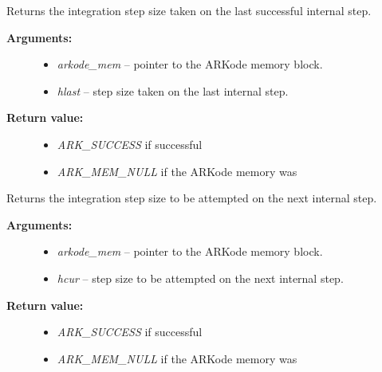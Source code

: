 \documentclass[letterpaper,10pt,english]{sphinxmanual}
\begin{document}
\begin{fulllineitems}
\label{c_interface/User_callable:ARKodeGetLastStep}
Returns the integration step size taken on the last successful
internal step.
\begin{description}
\item[{\textbf{Arguments:}}] \leavevmode\begin{itemize}
\item {} 
\emph{arkode\_mem} -- pointer to the ARKode memory block.

\item {} 
\emph{hlast} -- step size taken on the last internal step.

\end{itemize}

\item[{\textbf{Return value:}}] \leavevmode\begin{itemize}
\item {} 
\emph{ARK\_SUCCESS} if successful

\item {} 
\emph{ARK\_MEM\_NULL} if the ARKode memory was 

\end{itemize}

\end{description}

\end{fulllineitems}


\begin{fulllineitems}
\label{c_interface/User_callable:ARKodeGetCurrentStep}
Returns the integration step size to be attempted on the next internal step.
\begin{description}
\item[{\textbf{Arguments:}}] \leavevmode\begin{itemize}
\item {} 
\emph{arkode\_mem} -- pointer to the ARKode memory block.

\item {} 
\emph{hcur} -- step size to be attempted on the next internal step.

\end{itemize}

\item[{\textbf{Return value:}}] \leavevmode\begin{itemize}
\item {} 
\emph{ARK\_SUCCESS} if successful

\item {} 
\emph{ARK\_MEM\_NULL} if the ARKode memory was 

\end{itemize}

\end{description}

\end{fulllineitems}
\end{document}
